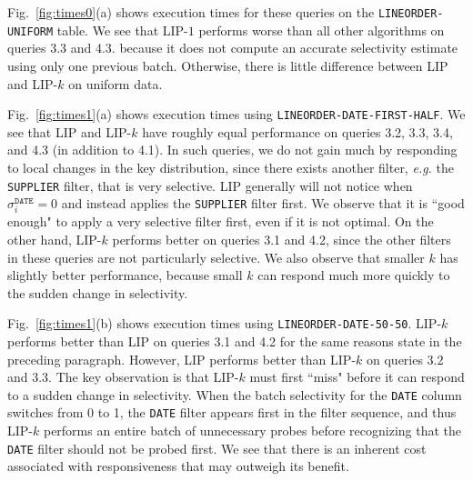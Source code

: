Fig.~\ref{fig:times0}(a) shows execution times for these queries on the \texttt{LINEORDER-UNIFORM} table.
We see that LIP-$1$ performs worse than all other algorithms on queries 3.3 and 4.3.
because it does not compute an accurate selectivity estimate using only one previous batch.
Otherwise, there is little difference between LIP and LIP-$k$ on uniform data.

Fig.~\ref{fig:times1}(a) shows execution times using \texttt{LINEORDER-DATE-FIRST-HALF}. 
We see that LIP and LIP-$k$ have roughly equal performance on queries 3.2, 3.3, 3.4, and 4.3 (in addition to 4.1).
In such queries, we do not gain much by responding to local changes in the key distribution,
since there exists another filter, {\it e.g.} the \texttt{SUPPLIER} filter, that is very selective. 
LIP generally will not notice when $\sigma_i^{\texttt{DATE}} = 0$ 
and instead applies the \texttt{SUPPLIER} filter first.
We observe that it is ``good enough" to apply a very selective filter first, even if it is not optimal.
On the other hand, LIP-$k$ performs better on queries 3.1 and 4.2, 
since the other filters in these queries are not particularly selective. 
We also observe that smaller $k$ has slightly better performance, 
because small $k$ can respond much more quickly to the sudden change in selectivity.

Fig.~\ref{fig:times1}(b) shows execution times using \texttt{LINEORDER-DATE-50-50}. 
LIP-$k$ performs better than LIP on queries 3.1 and 4.2 for the same reasons state in the preceding paragraph.
However, LIP performs better than LIP-$k$ on queries 3.2 and 3.3.
The key observation is that LIP-$k$ must first ``miss" before it can respond to a sudden change in selectivity.
When the batch selectivity for the \texttt{DATE} column switches from 0 to 1, 
the \texttt{DATE} filter appears first in the filter sequence, 
and thus LIP-$k$ performs an entire batch of unnecessary probes
before recognizing that the \texttt{DATE} filter should not be probed first.
We see that there is an inherent cost associated with responsiveness that may outweigh its benefit. 

